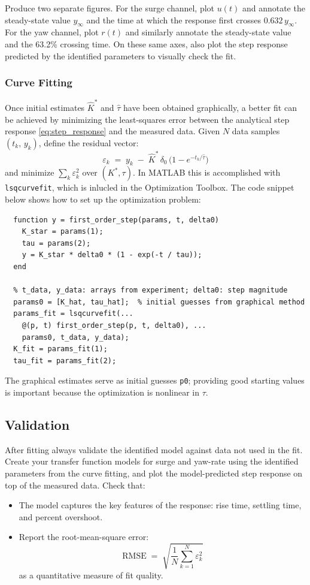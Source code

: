 \documentclass[../../book.tex]{subfiles}
\begin{document}
Produce two separate figures. For the surge channel, plot $u(t)$ and annotate the steady-state value $y_\infty$ and the time at which the response first crosses $0.632\,y_\infty$.  For the yaw channel, plot $r(t)$ and similarly annotate the steady-state value and the 63.2\% crossing time.  On these same axes, also plot the step response predicted by the identified parameters to visually check the fit.

\subsubsection{Curve Fitting}

Once initial estimates $\hat K^*$ and $\hat\tau$ have been obtained
graphically, a better fit can be achieved by minimizing the least-squares
error between the analytical step response \eqref{eq:step_response} and
the measured data.  Given $N$ data samples $(t_k,\,y_k)$, define the
residual vector:
\[
  \varepsilon_k \;=\; y_k \;-\; \hat K^*\,\delta_0\,
  \bigl(1 - e^{-t_k/\hat\tau}\bigr)
\]
and minimize $\sum_k \varepsilon_k^2$ over $(K^*, \tau)$.
In MATLAB this is accomplished with \texttt{lsqcurvefit}, which is inlucled in the Optimization Toolbox.  The code snippet below shows how to set up the optimization problem:

  \begin{verbatim}
  function y = first_order_step(params, t, delta0)
    K_star = params(1);
    tau = params(2);
    y = K_star * delta0 * (1 - exp(-t / tau));
  end

  % t_data, y_data: arrays from experiment; delta0: step magnitude
  params0 = [K_hat, tau_hat];  % initial guesses from graphical method
  params_fit = lsqcurvefit(...
    @(p, t) first_order_step(p, t, delta0), ...
    params0, t_data, y_data);
  K_fit = params_fit(1);
  tau_fit = params_fit(2);
  \end{verbatim}

The graphical estimates serve as initial guesses \texttt{p0}; providing
good starting values is important because the optimization is nonlinear
in $\tau$.

\subsection{Validation}

After fitting always validate the identified model against data not used in the fit.  Create your transfer function models for surge and yaw-rate using the identified parameters from the curve fitting, and plot the model-predicted step response on top of the measured data.  Check that:
\begin{itemize}
  \item The model captures the key features of the response: rise time,
        settling time, and percent overshoot.
  \item Report the root-mean-square error:
        \[
          \mathrm{RMSE} \;=\; \sqrt{\frac{1}{N}\sum_{k=1}^N \varepsilon_k^2}
        \]
        as a quantitative measure of fit quality.
\end{itemize}
\end{document}

